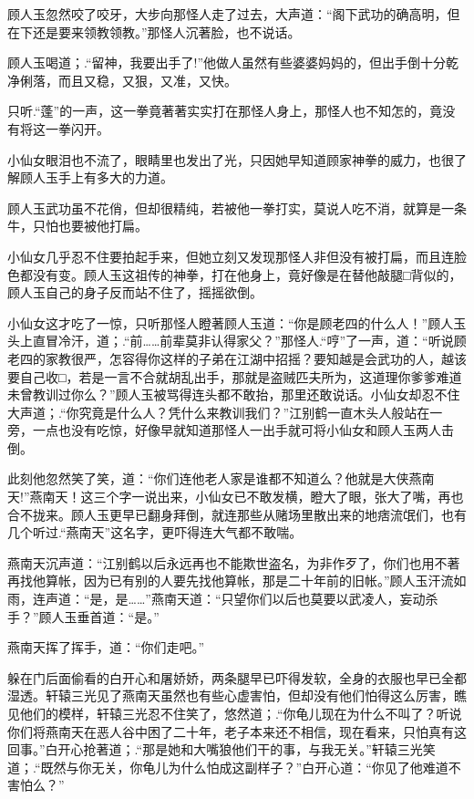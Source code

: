 \documentclass[12pt,oneside]{book}
\begin{document}
顾人玉忽然咬了咬牙，大步向那怪人走了过去，大声道：``阁下武功的确高明，但在下还是要来领教领教。''那怪人沉著脸，也不说话。

顾人玉喝道；.``留神，我要出手了!''他做人虽然有些婆婆妈妈的，但出手倒十分乾净俐落，而且又稳，又狠，又准，又快。

只听.``蓬''的一声，这一拳竟著著实实打在那怪人身上，那怪人也不知怎的，竟没有将这一拳闪开。

小仙女眼泪也不流了，眼睛里也发出了光，只因她早知道顾家神拳的威力，也很了解顾人玉手上有多大的力道。

顾人玉武功虽不花俏，但却很精纯，若被他一拳打实，莫说人吃不消，就算是一条牛，只怕也要被他打扁。

小仙女几乎忍不住要拍起手来，但她立刻又发现那怪人非但没有被打扁，而且连脸色都没有变。顾人玉这祖传的神拳，打在他身上，竟好像是在替他敲腿□背似的，顾人玉自己的身子反而站不住了，摇摇欲倒。

小仙女这才吃了一惊，只听那怪人瞪著顾人玉道：``你是顾老四的什么人！''顾人玉头上直冒冷汗，道；.``前\ldots\ldots 前辈莫非认得家父？''那怪人.``哼''了一声，道：``听说顾老四的家教很严，怎容得你这样的子弟在江湖中招摇？要知越是会武功的人，越该要自己收□，若是一言不合就胡乱出手，那就是盗贼匹夫所为，这道理你爹爹难道未曾教训过你么？''顾人玉被骂得连头都不敢抬，那里还敢说话。小仙女却忍不住大声道；.``你究竟是什么人？凭什么来教训我们？''江别鹤一直木头人般站在一旁，一点也没有吃惊，好像早就知道那怪人一出手就可将小仙女和顾人玉两人击倒。

此刻他忽然笑了笑，道：``你们连他老人家是谁都不知道么？他就是大侠燕南天!''燕南天！这三个字一说出来，小仙女已不敢发横，瞪大了眼，张大了嘴，再也合不拢来。顾人玉更早已翻身拜倒，就连那些从赌场里散出来的地痞流氓们，也有几个听过.``燕南天''这名字，更吓得连大气都不敢喘。

燕南天沉声道：``江别鹤以后永远再也不能欺世盗名，为非作歹了，你们也用不著再找他算帐，因为已有别的人要先找他算帐，那是二十年前的旧帐。''顾人玉汗流如雨，连声道：``是，是\ldots\ldots{}''燕南天道：``只望你们以后也莫要以武凌人，妄动杀手？''顾人玉垂首道：``是。''

燕南天挥了挥手，道：``你们走吧。''

躲在门后面偷看的白开心和屠娇娇，两条腿早已吓得发软，全身的衣服也早已全都湿透。轩辕三光见了燕南天虽然也有些心虚害怕，但却没有他们怕得这么厉害，瞧见他们的模样，轩辕三光忍不住笑了，悠然道；.``你龟儿现在为什么不叫了？听说你们将燕南天在恶人谷中困了二十年，老子本来还不相信，现在看来，只怕真有这回事。''白开心抢著道；.``那是她和大嘴狼他们干的事，与我无关。''轩辕三光笑道；.``既然与你无关，你龟儿为什么怕成这副样子？''白开心道：``你见了他难道不害怕么？''
\end{document}
